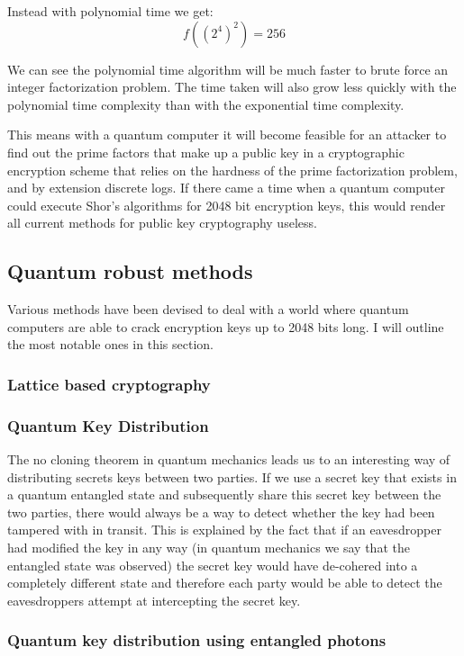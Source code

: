 \documentclass{article}
\begin{document}
Instead with polynomial time we get:
\[f((2^4)^2) = 256\]

We can see the polynomial time algorithm will be much faster to brute force an integer factorization problem. The time taken will also grow less quickly with the polynomial time complexity than with the exponential time complexity.

This means with a quantum computer it will become feasible for an attacker to find out the prime factors that make up a public key in a cryptographic encryption scheme that relies on the hardness of the prime factorization problem, and by extension discrete logs. If there came a time when a quantum computer could execute Shor's algorithms for 2048 bit encryption keys, this would render all current methods for public key cryptography useless.

\subsection{Quantum robust methods}
Various methods have been devised to deal with a world where quantum computers are able to crack encryption keys up to 2048 bits long. I will outline the most notable ones in this section. 

\subsubsection{Lattice based cryptography}

\subsubsection{Quantum Key Distribution}
The no cloning theorem in quantum mechanics leads us to an interesting way of distributing secrets keys between two parties. If we use a secret key that exists in a quantum entangled state and subsequently share this secret key between the two parties, there would always be a way to detect whether the key had been tampered with in transit. This is explained by the fact that if an eavesdropper had modified the key in any way (in quantum mechanics we say that the entangled state was observed) the secret key would have de-cohered into a completely different state and therefore each party would be able to detect the eavesdroppers attempt at intercepting the secret key. 

\subsubsection{Quantum key distribution using entangled photons}
\end{document}
